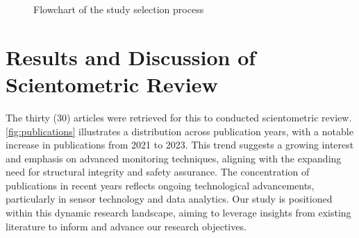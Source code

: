 \documentclass[journal, a4paper]{IEEEtran}
\begin{document}
\begin{figure}[hbtp]
  
    \centering
{}
\caption{Flowchart of the study selection process}
\label{fig:flowchartFilter}
\end{figure}





\section{Results and Discussion of Scientometric Review}
The thirty (30) articles were retrieved for this to conducted scientometric review.
\autoref{fig:publications} illustrates a distribution across publication years, with a notable increase in publications
from 2021 to 2023.
This trend suggests a growing interest and emphasis on advanced monitoring techniques,
aligning with the expanding need for structural integrity and safety assurance.
The concentration of publications in recent years reflects ongoing technological advancements,
particularly in sensor technology and data analytics.
Our study is positioned within this dynamic research landscape, aiming to leverage insights from existing
literature to inform and advance our research objectives.
\end{document}
